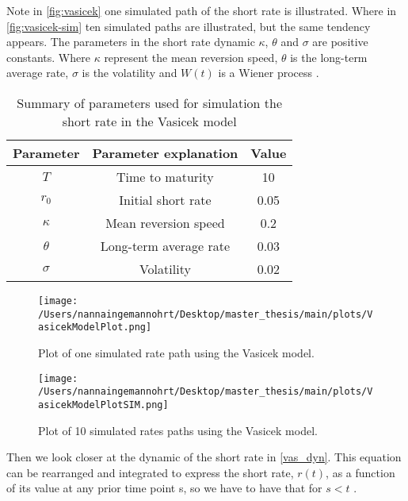  Note in \autoref{fig:vasicek}
one simulated path of the short rate is illustrated. Where in \autoref{fig:vasicek-sim} ten simulated paths are illustrated,
but the same tendency appears. The parameters in the short rate dynamic
$\kappa$, $\theta$ and $\sigma$ are positive constants. Where $\kappa$ represent the mean reversion speed, $\theta$ 
is the long-term average rate, $\sigma$ is the volatility  and $W(t)$ is a Wiener process \cite{Bermudan}. 
\\
\begin{table}[H]
    \centering
    \begin{tabular}{ccc}
      \toprule
      \textbf{Parameter} & \textbf{Parameter explanation} & \textbf{Value} \\
      \midrule
      \rowcolor{lightgray!40} $T$ & Time to maturity & 10 \\
      $r_0$ & Initial short rate & 0.05 \\
      \rowcolor{lightgray!40} $\kappa$ & Mean reversion speed & 0.2\\
      $\theta$ & Long-term average rate  & 0.03 \\
      \rowcolor{lightgray!40}$\sigma$ & Volatility& 0.02 \\
      \bottomrule
    \end{tabular}
    \caption{Summary of parameters used for simulation the short rate in the Vasicek model}
    \label{tab:parameters_short_rate}
\end{table}
\noindent
\begin{figure}[H]
    \centering
    \texttt{[image: /Users/nannaingemannohrt/Desktop/master\_thesis/main/plots/VasicekModelPlot.png]}
    \caption{Plot of one simulated rate path  using the Vasicek model.}
    \label{fig:vasicek}
\end{figure}
\noindent
\begin{figure}[H]
    \centering
    \texttt{[image: /Users/nannaingemannohrt/Desktop/master\_thesis/main/plots/VasicekModelPlotSIM.png]}
    \caption{Plot of 10 simulated  rates  paths using the Vasicek model.}
    \label{fig:vasicek-sim}
\end{figure}
\noindent
Then we look closer at the dynamic of the short rate in \autoref{vas_dyn}. This equation can be rearranged and integrated
to express the short rate, $r(t)$, as a function of its value at any prior time point s, 
so we have to have that for $s < t$ \cite{Bermudan}. 
